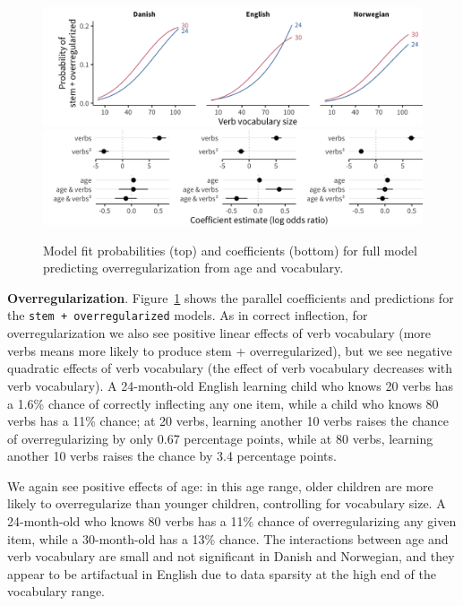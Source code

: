 \documentclass[
   11pt,
       ]{book}
\begin{document}
\begin{figure}

{\centering \includegraphics[width=\textwidth]{03-cdi-overreg/plots/overreg-traj} \includegraphics[width=\textwidth]{03-cdi-overreg/plots/overreg-coef} 

}

\caption{Model fit probabilities (top) and coefficients (bottom) for full model predicting overregularization from age and vocabulary.}\label{fig:overreg-overreg}
\end{figure}

\textbf{Overregularization}. Figure~\ref{fig:overreg-overreg} shows the parallel coefficients and predictions for the \texttt{stem\ +\ overregularized} models. As in correct inflection, for overregularization we also see positive linear effects of verb vocabulary (more verbs means more likely to produce stem + overregularized), but we see negative quadratic effects of verb vocabulary (the effect of verb vocabulary decreases with verb vocabulary). A 24-month-old English learning child who knows 20 verbs has a 1.6\% chance of correctly inflecting any one item, while a child who knows 80 verbs has a 11\% chance; at 20 verbs, learning another 10 verbs raises the chance of overregularizing by only 0.67 percentage points, while at 80 verbs, learning another 10 verbs raises the chance by 3.4 percentage points.

We again see positive effects of age: in this age range, older children are more likely to overregularize than younger children, controlling for vocabulary size. A 24-month-old who knows 80 verbs has a 11\% chance of overregularizing any given item, while a 30-month-old has a 13\% chance. The interactions between age and verb vocabulary are small and not significant in Danish and Norwegian, and they appear to be artifactual in English due to data sparsity at the high end of the vocabulary range.
\end{document}
